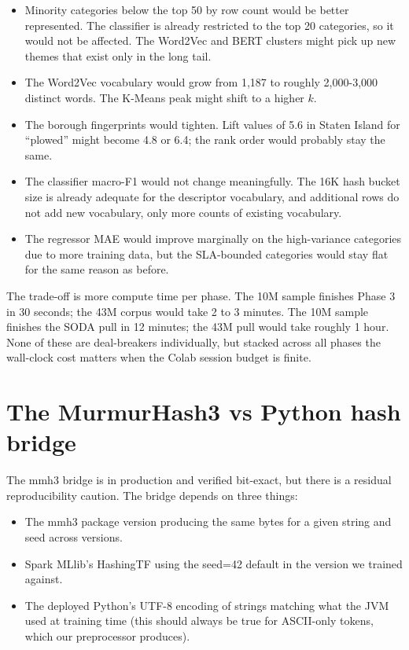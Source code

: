 \documentclass[11pt,letterpaper]{book}
\begin{document}
\begin{itemize}
\item Minority categories below the top 50 by row count would be better represented. The classifier is already restricted to the top 20 categories, so it would not be affected. The Word2Vec and BERT clusters might pick up new themes that exist only in the long tail.
\item The Word2Vec vocabulary would grow from 1,187 to roughly 2,000-3,000 distinct words. The K-Means peak might shift to a higher $k$.
\item The borough fingerprints would tighten. Lift values of 5.6 in Staten Island for ``plowed'' might become 4.8 or 6.4; the rank order would probably stay the same.
\item The classifier macro-F1 would not change meaningfully. The 16K hash bucket size is already adequate for the descriptor vocabulary, and additional rows do not add new vocabulary, only more counts of existing vocabulary.
\item The regressor MAE would improve marginally on the high-variance categories due to more training data, but the SLA-bounded categories would stay flat for the same reason as before.
\end{itemize}

The trade-off is more compute time per phase. The 10M sample finishes Phase 3 in 30 seconds; the 43M corpus would take 2 to 3 minutes. The 10M sample finishes the SODA pull in 12 minutes; the 43M pull would take roughly 1 hour. None of these are deal-breakers individually, but stacked across all phases the wall-clock cost matters when the Colab session budget is finite.

\section{The MurmurHash3 vs Python hash bridge}

The mmh3 bridge is in production and verified bit-exact, but there is a residual reproducibility caution. The bridge depends on three things:

\begin{itemize}
\item The mmh3 package version producing the same bytes for a given string and seed across versions.
\item Spark MLlib's HashingTF using the seed=42 default in the version we trained against.
\item The deployed Python's UTF-8 encoding of strings matching what the JVM used at training time (this should always be true for ASCII-only tokens, which our preprocessor produces).
\end{itemize}
\end{document}
